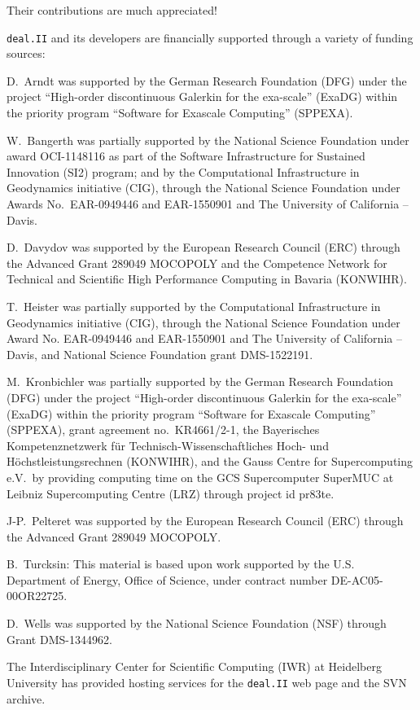 \documentclass{ansarticle-preprint}
\newcommand{\specialword}[1]{\texttt{#1}}
\newcommand{\dealii}{{\specialword{deal.II}}}
\begin{document}
Their contributions are much appreciated!


\bigskip

\dealii{} and its developers are financially supported through a
variety of funding sources:

D.~Arndt was supported by the German Research Foundation (DFG) under the
project ``High-order discontinuous Galerkin for the exa-scale'' (ExaDG) within the
priority program ``Software for Exascale Computing'' (SPPEXA).

W.~Bangerth was partially
supported by the National Science Foundation under award OCI-1148116
as part of the Software Infrastructure for Sustained Innovation (SI2)
program; and by the Computational Infrastructure in Geodynamics initiative
(CIG), through the National Science Foundation under Awards
No.~EAR-0949446 and EAR-1550901 and The University of California -- Davis.

D.~Davydov was supported by the European Research Council (ERC) through the Advanced Grant 289049 MOCOPOLY and the Competence Network for Technical and Scientific High Performance Computing in Bavaria (KONWIHR).

T.~Heister was partially supported by the Computational Infrastructure in
Geodynamics initiative (CIG), through the National Science Foundation
under Award No. EAR-0949446 and EAR-1550901 and The University of California -- Davis, and National Science Foundation grant DMS-1522191.

M.~Kronbichler was partially supported by the German Research Foundation (DFG)
under the project ``High-order discontinuous Galerkin for the exa-scale''
(ExaDG) within the priority program ``Software for Exascale Computing''
(SPPEXA), grant agreement no.~KR4661/2-1, the Bayerisches Kompetenznetzwerk
f\"ur Technisch-Wissenschaftliches Hoch- und H\"ochstleistungsrechnen
(KONWIHR), and the Gauss Centre for Supercomputing e.V.~by providing computing
time on the GCS Supercomputer SuperMUC at Leibniz Supercomputing Centre (LRZ)
through project id pr83te.

J-P.~Pelteret was supported by the European Research Council (ERC) through the Advanced Grant 289049 MOCOPOLY.

B.~Turcksin: This material is based upon work supported by the U.S. Department of
Energy, Office of Science, under contract number DE-AC05-00OR22725.


D.~Wells was supported by the National Science Foundation (NSF) through Grant
DMS-1344962.

The Interdisciplinary Center for Scientific Computing (IWR) at Heidelberg University has provided
hosting services for the \dealii{} web page and the SVN archive.


{}

\end{document}
